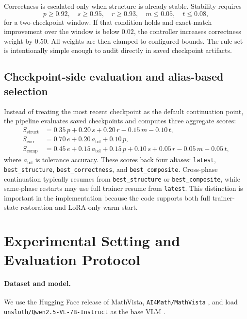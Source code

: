 \documentclass{article} %
\begin{document}
Correctness is escalated only when structure is already stable. Stability requires
\begin{equation}
p \ge 0.92,\quad s \ge 0.95,\quad r \ge 0.93,\quad m \le 0.05,\quad t \le 0.08,
\end{equation}
for a two-checkpoint window. If that condition holds and exact-match improvement over the window is below $0.02$, the controller increases correctness weight by $0.50$. All weights are then clamped to configured bounds. The rule set is intentionally simple enough to audit directly in saved checkpoint artifacts.

\subsection{Checkpoint-side evaluation and alias-based selection}

Instead of treating the most recent checkpoint as the default continuation point, the pipeline evaluates saved checkpoints and computes three aggregate scores:
\begin{align}
S_{\text{struct}} &= 0.35\,p + 0.20\,s + 0.20\,r - 0.15\,m - 0.10\,t, \\
S_{\text{corr}} &= 0.70\,e + 0.20\,a_{\text{tol}} + 0.10\,p, \\
S_{\text{comp}} &= 0.45\,e + 0.15\,a_{\text{tol}} + 0.15\,p + 0.10\,s + 0.05\,r - 0.05\,m - 0.05\,t,
\end{align}
where $a_{\text{tol}}$ is tolerance accuracy. These scores back four aliases: \texttt{latest}, \texttt{best\_structure}, \texttt{best\_correctness}, and \texttt{best\_composite}. Cross-phase continuation typically resumes from \texttt{best\_structure} or \texttt{best\_composite}, while same-phase restarts may use full trainer resume from \texttt{latest}. This distinction is important in the implementation because the code supports both full trainer-state restoration and LoRA-only warm start.

\section{Experimental Setting and Evaluation Protocol}

\paragraph{Dataset and model.} We use the Hugging Face release of MathVista, \texttt{AI4Math/MathVista} \citep{mathvista_hf,lu2024mathvista}, and load \texttt{unsloth/Qwen2.5-VL-7B-Instruct} as the base VLM \citep{unsloth_qwen25vl_hf,bai2025qwen25vl}.
\end{document}
